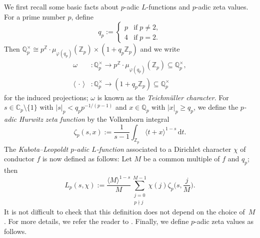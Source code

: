 \documentclass[12pt]{article}
\let\ge\geqslant
\renewcommand{\d}{\mathrm{d}}
\theoremstyle{remark}
\numberwithin{equation}{section}
\begin{document}
%
%
%
We first recall some basic facts about $p$-adic $L$-functions and $p$-adic zeta values. For a prime number $p$, define
\[
	q_p:=\begin{cases}
		p &\text{if}\; p\ne 2,\\
		4 &\text{if}\; p=2.
	\end{cases}
\]
Then $\mathbb{Q}_p^\times \cong p^{\mathbb{Z}} \cdot \mu_{\varphi(q_p)}(\mathbb{Z}_p)\times (1+q_p\mathbb{Z}_p)$ and we write 
\begin{align*}
	\omega &\colon \mathbb{Q}_p^\times\to p^{\mathbb{Z}} \cdot \mu_{\varphi(q_p)}(\mathbb{Z}_p)\subseteq \mathbb{Q}_p^\times, \\ 
	\langle \,\cdot\, \rangle &\colon \mathbb{Q}_p^\times\to (1+q_p\mathbb{Z}_p) \subseteq\mathbb{Q}_p^\times
\end{align*}
for the induced projections; $\omega$ is known as the \emph{Teichm\"uller character}.
For $s\in \mathbb{C}_p\setminus \{1\}$ with $|s|_p<q_p p^{-1/(p-1)}$ and $x\in \mathbb{Q}_p$ with $|x|_p\ge q_p$, we define the \emph{$p$-adic Hurwitz zeta function} by the Volkenborn integral
\[
	\zeta_p(s,x):=\frac{1}{s-1}\int_{\mathbb{Z}_p} \langle t+x \rangle^{1-s}\,\d t.
\]
The \emph{Kubota--Leopoldt $p$-adic $L$-function} associated to a Dirichlet character $\chi$ of conductor $f$ is now defined as follows: Let $M$ be a common multiple of $f$ and $q_p$; then
\[
	L_p(s,\chi):=\frac{\langle M\rangle^{1-s}}{M}\sum_{\substack{j=0\\ p\nmid j}}^{M-1} \chi(j)\zeta_p\bigg( s,\frac{j}{M} \bigg).
\]
It is not difficult to check that this definition does not depend on the choice of~$M$.
For more details, we refer the reader to \cite[Chap.~11]{Coh2007}. 
Finally, we define $p$-adic zeta values as follows.
\end{document}
